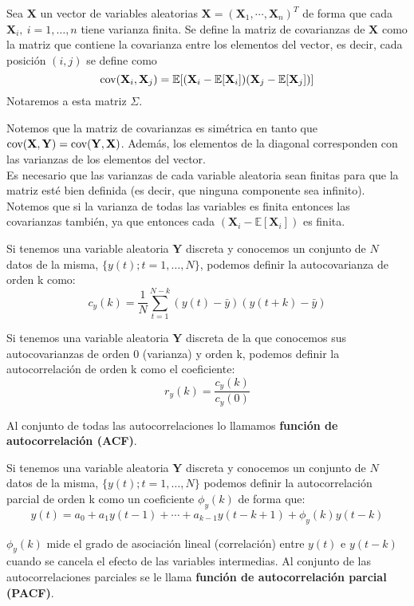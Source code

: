 \begin{definicion}
	Sea $\mathbf{X}$ un vector de variables aleatorias $\mathbf{X}=(\mathbf{X}_1, \cdots, \mathbf{X}_n)^T$ de forma que cada $\mathbf{X}_i,\ i=1, \dots, n$ tiene varianza finita. Se define la matriz de covarianzas de $\mathbf{X}$ como la matriz que contiene la covarianza entre los elementos del vector, es decir, cada posición $(i,j)$ se define como 
	\[ \text{cov}{(\mathbf{X}_i, \mathbf{X}_j)} = \mathbb{E}[(\mathbf{X}_i - \mathbb{E}[\mathbf{X}_i])(\mathbf{X}_j - \mathbb{E}[\mathbf{X}_j])]	\]
	Notaremos a esta matriz $\Sigma$.
\end{definicion}

Notemos que la matriz de covarianzas es simétrica en tanto que $\text{cov}{(\mathbf{X}, \mathbf{Y})} = \text{cov}{(\mathbf{Y}, \mathbf{X})}$. Además, los elementos de la diagonal corresponden con las varianzas de los elementos del vector.\\

Es necesario que las varianzas de cada variable aleatoria sean finitas para que la matriz esté bien definida (es decir, que ninguna componente sea infinito). Notemos que si la varianza de todas las variables es finita entonces las covarianzas también, ya que entonces cada $(\mathbf{X}_i - \mathbb{E}[\mathbf{X}_i])$ es finita.

\begin{definicion}
Si tenemos una variable aleatoria $\mathbf{Y}$ discreta y conocemos un conjunto de $N$ datos de la misma, $\{y(t); t=1,\dots,N\}$, podemos definir la autocovarianza de orden k como:
\[	c_y(k) = \frac{1}{N} \sum_{t=1}^{N-k}(y(t)-\bar{y})(y(t+k)-\bar{y})	\]
\end{definicion}

\begin{definicion}
Si tenemos una variable aleatoria $\mathbf{Y}$ discreta de la que conocemos sus autocovarianzas de orden 0 (varianza) y orden k, podemos definir la autocorrelación de orden k como el coeficiente:
\[	r_y(k) = \frac{c_y(k)}{c_y(0)}	\]

Al conjunto de todas las autocorrelaciones lo llamamos \textbf{función de autocorrelación (ACF)}.
\end{definicion}

\begin{definicion}
Si tenemos una variable aleatoria $\mathbf{Y}$ discreta y conocemos un conjunto de $N$ datos de la misma, $\{y(t); t=1,\dots,N\}$ podemos definir la autocorrelación parcial de orden k como un coeficiente $\phi_y(k)$ de forma que:
\[	y(t) = a_0 + a_1y(t-1)+\cdots + a_{k-1}y(t-k+1) + \phi_y(k)y(t-k)	\]

$\phi_y(k)$ mide el grado de asociación lineal (correlación) entre $y(t)$ e $y(t-k)$ cuando se cancela el efecto de las variables intermedias. Al conjunto de las autocorrelaciones parciales se le llama \textbf{función de autocorrelación parcial (PACF)}.
\end{definicion}

